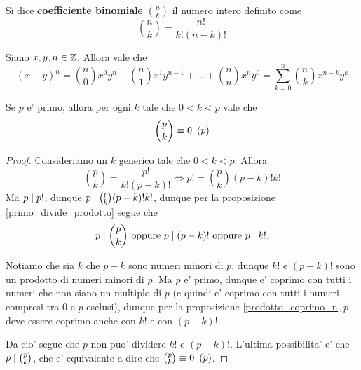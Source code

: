 \begin{definition}
    Si dice \textbf{coefficiente binomiale} $\binom{n}{k}$ il numero intero definito come \begin{equation}
        \binom{n}{k} = \frac{n!}{k!(n-k)!}
    \end{equation}    
\end{definition}

\begin{theorem} \label{binomiale}
    Siano $x, y, n \in \mathbb{Z}$. Allora vale che
    \begin{equation}
        (x+y)^n = \binom{n}{0}x^0y^n + \binom{n}{1}x^1y^{n-1} + \dots + \binom{n}{n}x^ny^0 = \sum_{k=0}^n \binom{n}{k}x^{n-k}y^k
    \end{equation}
\end{theorem}

\begin{proposition}\label{binomio_pk_divisibile_p}
    Se $p$ e' primo, allora per ogni $k$ tale che $0 < k < p$ vale che
    \begin{equation}
        \binom{p}{k} \equiv 0 \ \left(p\right)
    \end{equation}
\end{proposition}
\begin{proof}
    Consideriamo un $k$ generico tale che $0 < k < p$.
    Allora \[
        \binom{p}{k} = \frac{p!}{k!(p-k)!} \iff p! = \binom{p}{k}(p-k)!k!    
    \]
    Ma $p \mid p!$, dunque $p \mid \binom{p}{k}(p-k)!k!$, dunque per la proposizione \ref{primo_divide_prodotto} segue che \[
        p \mid \binom{p}{k} \text{ oppure } p \mid (p-k)! \text{ oppure } p \mid k!
    .\]

    Notiamo che sia $k$ che $p-k$ sono numeri minori di $p$, dunque $k!$ e $(p-k)!$ sono un prodotto di numeri minori di $p$. Ma $p$ e' primo, dunque e' coprimo con tutti i numeri che non siano un multiplo di $p$ (e quindi e' coprimo con tutti i numeri compresi tra $0$ e $p$ esclusi), dunque per la proposizione \ref{prodotto_coprimo_n} $p$ deve essere coprimo anche con $k!$ e con $(p-k)!$. 
    
    Da cio' segue che $p$ non puo' dividere $k!$ e $(p-k)!$.
    L'ultima possibilita' e' che $p \mid \binom{p}{k}$, che e' equivalente a dire che $\binom{p}{k} \equiv 0 \ \left(p\right)$.
\end{proof}

